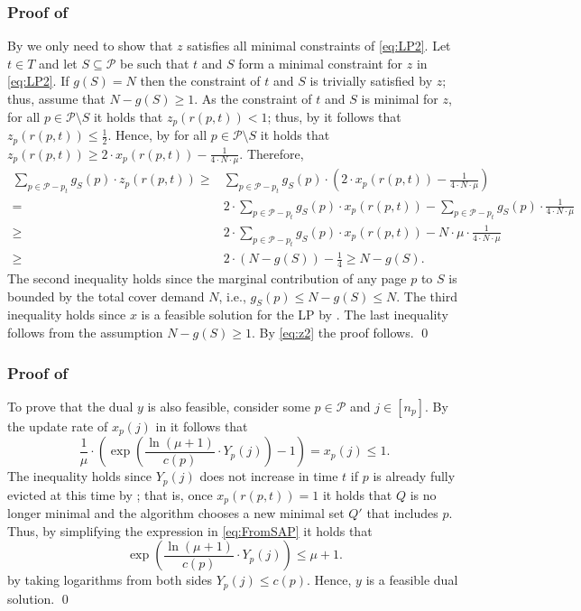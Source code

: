 \documentclass[11pt]{article}
\newcommand{\cP}{{\mathcal{P}}}
\begin{document}
\subsubsection*{Proof of }
 	By  we only need to show that $z$ satisfies all minimal constraints of \eqref{eq:LP2}. Let $t \in T$ and let $S \subseteq \cP$ be such that $t$ and $S$ form a minimal constraint for $z$ in  \eqref{eq:LP2}. If $g(S) = N$ then the constraint of $t$ and $S$ is trivially satisfied by $z$; thus, assume that $N-g(S) \geq 1$. As the constraint of $t$ and $S$ is minimal for $z$, for all $p \in \cP\setminus S$ it holds that $z_p(r(p,t)) < 1$; thus, by  it follows that $z_p(r(p,t)) \leq \frac{1}{2}$. Hence,  by  for all $p \in \cP\setminus S$ it holds that 
 $z_p(r(p,t)) \geq 2 \cdot x_p(r(p,t))-\frac{1}{4 \cdot N \cdot \mu}$.
 Therefore,
\begin{equation}
	\label{eq:z2}
	\begin{aligned}
		 \sum_{p \in \cP-p_t} g_S(p) \cdot z_p(r(p,t))
		\geq{} &   \sum_{p \in \cP-p_t} g_S(p) \cdot \left( 2 \cdot x_p(r(p,t))-\frac{1}{4 \cdot N \cdot \mu} \right)\\
		={} & 2 \cdot \sum_{p \in \cP-p_t} g_S(p) \cdot x_p(r(p,t))-\sum_{p \in \cP-p_t} g_S(p) \cdot \frac{1}{4 \cdot N \cdot \mu} \\
		\geq{} & 2 \cdot \sum_{p \in \cP-p_t} g_S(p) \cdot x_p(r(p,t))-N \cdot \mu \cdot \frac{1}{4 \cdot N \cdot \mu} \\
			\geq{} & 2 \cdot \left(N-g(S)\right)-\frac{1}{4} 
				\geq N-g(S). 
	\end{aligned}
\end{equation}
The second inequality holds since the marginal contribution of any page $p$ to $S$ is bounded by the total cover demand $N$, i.e., $g_S(p) \leq N-g(S) \leq N$. The third inequality holds since $x$ is a feasible solution for the LP by .   The last inequality follows from the assumption $N-g(S) \geq 1$. By \eqref{eq:z2} the proof follows. \qed


\subsubsection*{Proof of }
To prove that the dual $y$ is also feasible, consider some $p \in \cP$ and $j \in [n_p]$. By the update rate of $x_p(j)$ in  it follows that 
		\begin{equation}
		\label{eq:FromSAP}
		\frac{1}{\mu} \cdot \left(     \exp \left(  \frac{\ln (\mu+1)}{c(p)} \cdot Y_p(j)\right)-1\right) = x_p(j) \leq 1.
	\end{equation} 
	The inequality holds since $Y_p(j)$ does not increase in time $t$ if $p$ is already fully evicted at this time by ; that is, once $x_p(r(p,t)) = 1$ it holds that $Q$ is no longer minimal and the algorithm chooses a new minimal set $Q'$ that includes $p$. Thus, by simplifying the expression in \eqref{eq:FromSAP} it holds that 
	$$\exp \left( \frac{\ln (\mu+1)}{c(p)} \cdot Y_p(j) \right) \leq \mu+1.$$
	by taking logarithms from both sides $Y_p(j) \leq c(p)$. Hence, $y$ is a feasible dual solution. \qed
\end{document}
